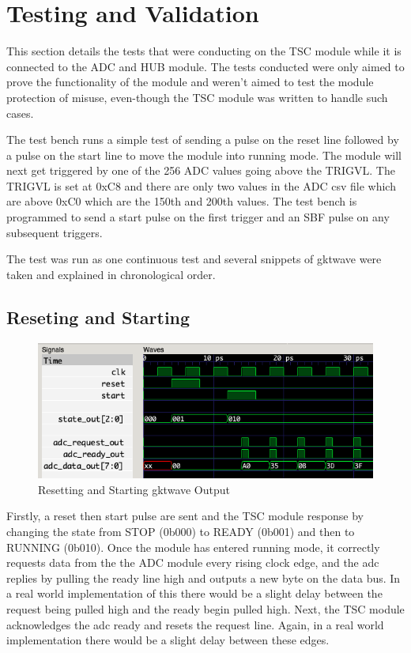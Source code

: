 \section{Testing and Validation}
This section details the tests that were conducting on the TSC module while it is connected to the ADC and HUB module.
The tests conducted were only aimed to prove the functionality of the module and weren't aimed to test the module protection of misuse, even-though the TSC module was written to handle such cases.

The test bench runs a simple test of sending a pulse on the reset line followed by a pulse on the start line to move the module into running mode.
The module will next get triggered by one of the 256 ADC values going above the TRIGVL.
The TRIGVL is set at 0xC8 and there are only two values in the ADC csv file which are above 0xC0 which are the 150th and 200th values.
The test bench is programmed to send a start pulse on the first trigger and an SBF pulse on any subsequent triggers.

The test was run as one continuous test and several snippets of gktwave were taken and explained in chronological order.

\subsection{Reseting and Starting}
\begin{figure}[H]
    \centering
    \includegraphics[width=\columnwidth]{Figures/Areset_start_adc}
    \caption{Resetting and Starting gktwave Output}
    \label{fig:testA}
\end{figure}

Firstly, a reset then start pulse are sent and the TSC module response by changing the state from STOP (0b000) to READY (0b001) and then to RUNNING (0b010).
Once the module has entered running mode, it correctly requests data from the the ADC module every rising clock edge, and the adc replies by pulling the ready line high and outputs a new byte on the data bus.
In a real world implementation of this there would be a slight delay between the request being pulled high and the ready begin pulled high.
Next, the TSC module acknowledges the adc ready and resets the request line.
Again, in a real world implementation there would be a slight delay between these edges.


